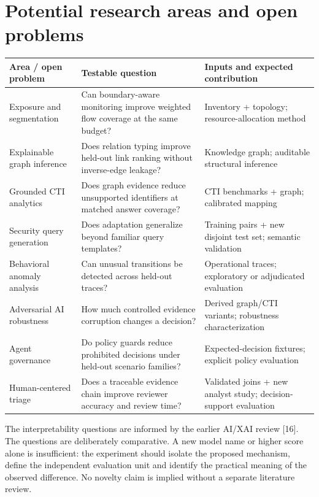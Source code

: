 \clearpage\section{Potential research areas and open problems}
\begingroup\small\setlength{\tabcolsep}{5pt}\renewcommand{\arraystretch}{1.22}
\begin{tabularx}{\linewidth}{>{\raggedright\arraybackslash}X>{\raggedright\arraybackslash}X>{\raggedright\arraybackslash}X}
\toprule
\textbf{Area / open problem} & \textbf{Testable question} & \textbf{Inputs and expected contribution}\\
\midrule
Exposure and segmentation & Can boundary-aware monitoring improve weighted flow coverage at the same budget? & Inventory + topology; resource-allocation method\\
Explainable graph inference & Does relation typing improve held-out link ranking without inverse-edge leakage? & Knowledge graph; auditable structural inference\\
Grounded CTI analytics & Does graph evidence reduce unsupported identifiers at matched answer coverage? & CTI benchmarks + graph; calibrated mapping\\
Security query generation & Does adaptation generalize beyond familiar query templates? & Training pairs + new disjoint test set; semantic validation\\
Behavioral anomaly analysis & Can unusual transitions be detected across held-out traces? & Operational traces; exploratory or adjudicated evaluation\\
Adversarial AI robustness & How much controlled evidence corruption changes a decision? & Derived graph/CTI variants; robustness characterization\\
Agent governance & Do policy guards reduce prohibited decisions under held-out scenario families? & Expected-decision fixtures; explicit policy evaluation\\
Human-centered triage & Does a traceable evidence chain improve reviewer accuracy and review time? & Validated joins + new analyst study; decision-support evaluation\\
\bottomrule\end{tabularx}\endgroup\par\medskip
The interpretability questions are informed by the earlier AI/XAI review [16]. The questions are deliberately comparative. A new model name or higher score alone is insufficient: the experiment should isolate the proposed mechanism, define the independent evaluation unit and identify the practical meaning of the observed difference. No novelty claim is implied without a separate literature review.


